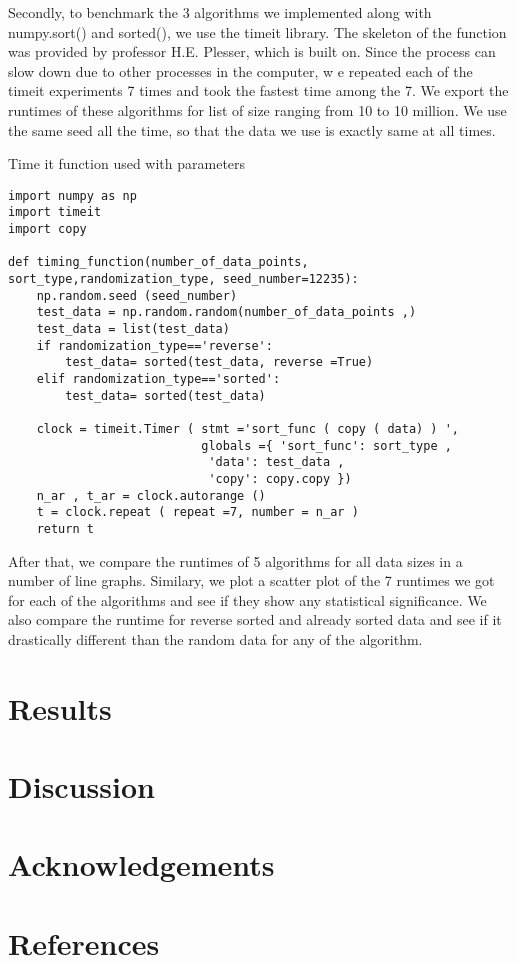 \documentclass[sigconf, nonacm, natbib, screen, balance=False]{acmart}
\begin{document}
Secondly, to benchmark the 3 algorithms we  implemented along with numpy.sort() and sorted(), we use the timeit library. The skeleton of the 
function was provided by professor H.E. Plesser, which is built on. Since the process can slow down due to other processes in the computer, w
e repeated each of the timeit experiments 7 times and took the fastest time among the 7. We export the runtimes of these algorithms for 
list of size ranging from 10 to 10 million. We use the same seed all the time, so that the data we use is exactly same at all times.

\begin{listing}
  \caption{Time it function used with parameters}
  \label{lst:time_it function}

\begin{verbatim}
import numpy as np
import timeit
import copy

def timing_function(number_of_data_points, sort_type,randomization_type, seed_number=12235):
    np.random.seed (seed_number)
    test_data = np.random.random(number_of_data_points ,)
    test_data = list(test_data)
    if randomization_type=='reverse':
        test_data= sorted(test_data, reverse =True)
    elif randomization_type=='sorted':
        test_data= sorted(test_data)

    clock = timeit.Timer ( stmt ='sort_func ( copy ( data) ) ', 
                           globals ={ 'sort_func': sort_type ,
                            'data': test_data ,
                            'copy': copy.copy })
    n_ar , t_ar = clock.autorange ()
    t = clock.repeat ( repeat =7, number = n_ar )
    return t
\end{verbatim}
\end{listing}


After that, we compare the runtimes of 5 algorithms for all data sizes in a number of line graphs. Similary, we plot a scatter plot of the 7 runtimes 
we got for each of the algorithms and see if they show any statistical significance. We also compare the runtime for reverse sorted and already sorted
data and see if it drastically different than the random data for any of the algorithm.

\section{Results}\label{sec:results}

\section{Discussion}\label{sec:discussion}

\section{Acknowledgements}\label{sec:acknowledgements}

\section{References}\label{sec:references}



\end{document}
